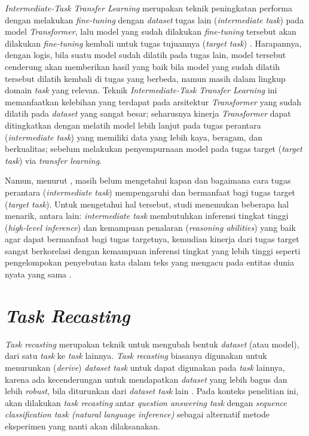\emph{Intermediate-Task Transfer Learning} merupakan teknik peningkatan performa dengan melakukan \emph{fine-tuning} dengan \emph{dataset} tugas lain (\emph{intermediate task}) pada model \emph{Transformer}, lalu model yang sudah dilakukan \emph{fine-tuning} tersebut akan dilakukan \emph{fine-tuning} kembali untuk tugas tujuannya (\emph{target task}) \citep{pruksachatkun-etal-2020-intermediate}. Harapannya, dengan logis, bila suatu model sudah dilatih pada tugas lain, model tersebut cenderung akan memberikan hasil yang baik bila model yang sudah dilatih tersebut dilatih kembali di tugas yang berbeda, namun masih dalam lingkup domain \emph{task} yang relevan. Teknik \emph{Intermediate-Task Transfer Learning} ini memanfaatkan kelebihan yang terdapat pada arsitektur \emph{Transformer} yang sudah dilatih pada \emph{dataset} yang sangat besar; seharusnya kinerja \emph{Transformer} dapat ditingkatkan dengan melatih model lebih lanjut pada tugas perantara (\emph{intermediate task}) yang memiliki data yang lebih kaya, beragam, dan berkualitas; sebelum melakukan penyempurnaan model pada tugas target (\emph{target task}) via \emph{transfer learning}. 

Namun, menurut \citet{pruksachatkun-etal-2020-intermediate}, masih belum mengetahui kapan dan bagaimana cara tugas perantara (\emph{intermediate task}) mempengaruhi dan bermanfaat bagi tugas target (\emph{target task}). Untuk mengetahui hal tersebut, studi \citet{pruksachatkun-etal-2020-intermediate} menemukan beberapa hal menarik, antara lain: \emph{intermediate task} membutuhkan inferensi tingkat tinggi (\emph{high-level inference}) dan kemampuan penalaran (\emph{reasoning abilities}) yang baik agar dapat bermanfaat bagi tugas targetnya, kemudian kinerja dari tugas target sangat berkorelasi dengan kemampuan inferensi tingkat yang lebih tinggi seperti pengelompokan penyebutan kata dalam teks yang mengacu pada entitas dunia nyata yang sama \citep{coference-resolution}.

\section{\emph{Task Recasting}}
\emph{Task recasting} merupakan teknik untuk mengubah bentuk \emph{dataset} (atau model), dari satu \emph{task} ke \emph{task} lainnya. \emph{Task recasting} biasanya digunakan untuk menurunkan (\emph{derive}) \emph{dataset task} untuk dapat digunakan pada \emph{task} lainnya, karena ada kecenderungan untuk mendapatkan \emph{dataset} yang lebih bagus dan lebih \emph{robust}, bila diturunkan dari \emph{dataset task} lain \citep{DBLP:journals/corr/abs-1809-02922}. Pada konteks penelitian ini, akan dilakukan \emph{task recasting} antar \emph{question answering task} dengan \emph{sequence classification task (natural language inference)} sebagai alternatif metode eksperimen yang nanti akan dilaksanakan. 

